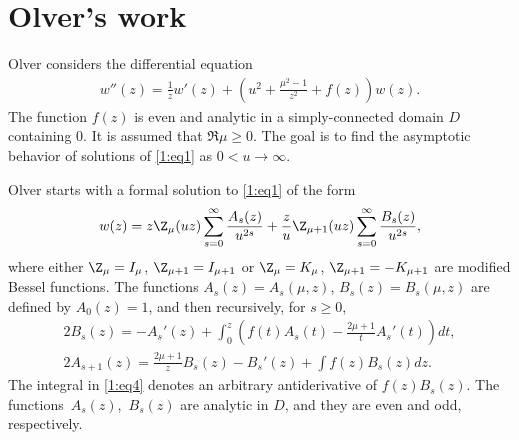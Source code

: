 \section{Olver's work}\label{Olver}
Olver \cite[(7.3)]{O} considers the dif\/ferential equation
\begin{gather}\label{1:eq1}
w''(z)=\frac1z w'(z)+\left(u^2+\frac{\mu^2-1}{z^2}+f(z)\right)w(z) .
\end{gather}
The function $f(z)$ is even and analytic in a simply-connected domain $D$ containing $0$.
It is assumed that $\Re\mu\ge 0$.
The goal is to f\/ind the asymptotic
behavior of solutions of \eqref{1:eq1} as $0<u\to\infty$.

Olver \cite[(7.4)]{O} starts with a formal solution to \eqref{1:eq1} of the form
\begin{gather*}%
 w(z)=z\Z_\mu(uz)\sum_{s=0}^\infty \frac{A_s(z)}{u^{2s}}+\frac{z}{u}\Z_{\mu+1}(uz)\sum_{s=0}^\infty \frac{B_s(z)}{u^{2s}} ,
\end{gather*}
where either $\Z_\mu=I_\mu$, $\Z_{\mu+1}=I_{\mu+1}$ or $\Z_\mu=K_\mu$, $\Z_{\mu+1}=-K_{\mu+1}$ are modif\/ied Bessel functions.
The functions $A_s(z)=A_s(\mu,z)$, $B_s(z)=B_s(\mu,z)$ are def\/ined by $A_0(z)=1$, and then recursively, for $s\ge 0$,
\begin{gather}
2B_s(z) = -A_s'(z)+\int_0^z\left(f(t)A_s(t)-\frac{2\mu+1}{t} A_s'(t)\right) dt,\label{1:eq3}\\
2A_{s+1}(z) = \frac{2\mu+1}{z} B_s(z)- B_s'(z)+\int f(z)B_s(z) dz.\label{1:eq4}
\end{gather}
The integral in \eqref{1:eq4} denotes an arbitrary antiderivative of $f(z)B_s(z)$.
The func\-tions~$A_s(z)$,~$B_s(z)$ are analytic in $D$, and they are even and odd, respectively.

